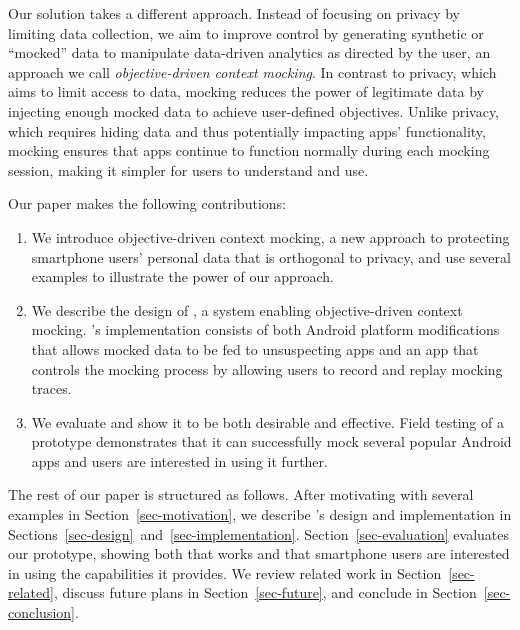 
Our solution takes a different approach. Instead of focusing on privacy by
limiting data collection, we aim to improve control by generating synthetic or
``mocked'' data to manipulate data-driven analytics as directed by the user, an
approach we call \textit{objective-driven context mocking}. In contrast to
privacy, which aims to limit access to data, mocking reduces the power of
legitimate data by injecting enough mocked data to achieve user-defined
objectives.  Unlike privacy, which requires hiding data and thus potentially
impacting apps' functionality, mocking ensures that apps continue to function
normally during each mocking session, making it simpler for users to understand
and use.

Our paper makes the following contributions:

\begin{enumerate}

\item We introduce objective-driven context mocking, a new approach to
protecting smartphone users' personal data that is orthogonal to privacy, and
use several examples to illustrate the power of our approach.

\item We describe the design of \PocketMocker{}, a system enabling
objective-driven context mocking. \PocketMocker{}'s
implementation consists of both Android platform modifications that allows
mocked data to be fed to unsuspecting apps and an app that controls the mocking
process by allowing users to record and replay mocking traces.

\item We evaluate \PocketMocker{} and show it to be both desirable and
effective. Field testing of a \PocketMocker{} prototype demonstrates that it
can successfully mock several popular Android apps and users are interested in
using it further.

\end{enumerate}

The rest of our paper is structured as follows. After motivating
\PocketMocker{} with several examples in Section~\ref{sec-motivation}, we
describe \PocketMocker{}'s design and implementation in
Sections~\ref{sec-design}~and~\ref{sec-implementation}.
Section~\ref{sec-evaluation} evaluates our \PocketMocker{} prototype, showing
both that \PocketMocker{} works and that smartphone users are interested in
using the capabilities it provides. We review related work in
Section~\ref{sec-related}, discuss future plans in Section~\ref{sec-future},
and conclude in Section~\ref{sec-conclusion}.
